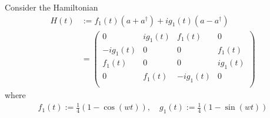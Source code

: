 \documentclass[12pt]{article}
\begin{document}
Consider the Hamiltonian  
\begin{align*}
  H(t) &:= f_1(t) (a+a^{\dagger} ) + ig_1(t)(a-a^{\dagger})  \\
  & = 
  \begin{pmatrix}
      0      & ig_1(t) & f_1(t) & 0 \\
     -ig_1(t) & 0      & 0      & f_1(t) \\
      f_1(t) & 0      & 0      & ig_1(t) \\
      0      & f_1(t) &-ig_1(t) & 0 \\
  \end{pmatrix}
\end{align*}
where
\begin{align*}
  f_1(t) := \frac 14(1-\cos(wt)), \quad g_1(t) := \frac 14 (1-\sin(wt))
\end{align*}
\end{document}
